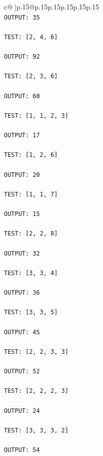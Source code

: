 \documentclass{article}
\begin{document}
{\begin{supertabular}{c@{$\;$}|p{.15\linewidth}@{}p{.15\linewidth}p{.15\linewidth}p{.15\linewidth}p{.15\linewidth}p{.15\linewidth}}
{{{\\ 
\texttt{OUTPUT: 35} \\
\\ 
\texttt{TEST: {[}2, 4, 6{]}} \\
\\ 
\texttt{OUTPUT: 92} \\
\\ 
\texttt{TEST: {[}2, 3, 6{]}} \\
\\ 
\texttt{OUTPUT: 60} \\
\\ 
\texttt{TEST: {[}1, 1, 2, 3{]}} \\
\\ 
\texttt{OUTPUT: 17} \\
\\ 
\texttt{TEST: {[}1, 2, 6{]}} \\
\\ 
\texttt{OUTPUT: 20} \\
\\ 
\texttt{TEST: {[}1, 1, 7{]}} \\
\\ 
\texttt{OUTPUT: 15} \\
\\ 
\texttt{TEST: {[}2, 2, 8{]}} \\
\\ 
\texttt{OUTPUT: 32} \\
\\ 
\texttt{TEST: {[}3, 3, 4{]}} \\
\\ 
\texttt{OUTPUT: 36} \\
\\ 
\texttt{TEST: {[}3, 3, 5{]}} \\
\\ 
\texttt{OUTPUT: 45} \\
\\ 
\texttt{TEST: {[}2, 2, 3, 3{]}} \\
\\ 
\texttt{OUTPUT: 52} \\
\\ 
\texttt{TEST: {[}2, 2, 2, 3{]}} \\
\\ 
\texttt{OUTPUT: 24} \\
\\ 
\texttt{TEST: {[}3, 3, 3, 2{]}} \\
\\ 
\texttt{OUTPUT: 54} \\
\\ 
}}}
\end{supertabular}}
\end{document}
